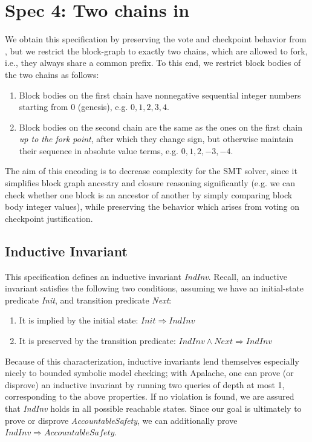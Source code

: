 
\section{Spec 4: Two chains in \tlap{}}\label{sec:spec4}

We obtain this specification by preserving the vote and checkpoint behavior from \SpecThree{}, but we restrict the block-graph to exactly two chains, which are allowed to fork, i.e., they always share a common prefix.
To this end, we restrict block bodies of the two chains as follows:
\begin{enumerate}
	\item Block bodies on the first chain have nonnegative sequential integer numbers starting from 0 (genesis), e.g. $0, 1, 2,3, 4$.
	\item Block bodies on the second chain are the same as the ones on the first chain \emph{up to the fork point}, after which they change sign, but otherwise maintain their sequence in absolute value terms, e.g. $0, 1,2,-3,-4$.
\end{enumerate}

The aim of this encoding is to decrease complexity for the SMT solver, since it simplifies block graph ancestry and closure reasoning significantly (e.g. we can check whether one block is an ancestor of another by simply comparing block body integer values), while preserving the behavior which arises from voting on checkpoint justification.

\subsection{Inductive Invariant} 
This specification defines an inductive invariant \textit{IndInv}. Recall, an inductive invariant satisfies the following two conditions, assuming we have an initial-state predicate \textit{Init}, and transition predicate \textit{Next}:
\begin{enumerate}
	\item It is implied by the initial state: $\mathit{Init} \Rightarrow \mathit{IndInv}$
	\item It is preserved by the transition predicate: $\mathit{IndInv} \land \mathit{Next} \Rightarrow \mathit{IndInv}$
\end{enumerate}
Because of this characterization, inductive invariants lend themselves especially nicely to bounded symbolic model checking; with Apalache, one can prove (or disprove) an inductive invariant by running two queries of depth at most 1, corresponding to the above properties.
If no violation is found, we are assured that \textit{IndInv} holds in all possible reachable states.
Since our goal is ultimately to prove or disprove \textit{AccountableSafety}, we can additionally prove $\mathit{IndInv} \Rightarrow \mathit{AccountableSafety}$.

